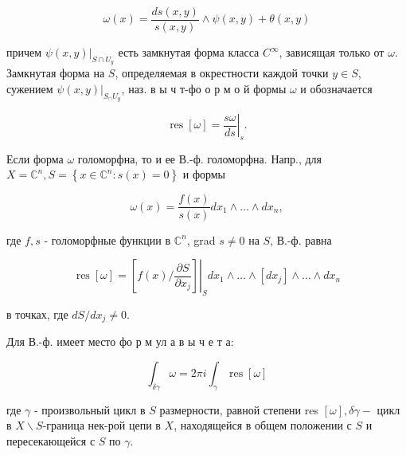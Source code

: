\documentclass[10pt]{article}
\begin{document}
\[

\omega(x)=\frac{d s(x, y)}{s(x, y)} \wedge \psi(x, y)+\theta(x, y)

\]



причем $\left.\psi(x, y)\right|_{S \cap U_{y}}$ есть замкнутая форма класса $C^{\infty}$, зависящая только от $\omega$. Замкнутая форма на $S$, определяемая в окрестности каждой точки $y \in S$, сужением $\left.\psi(x, y)\right|_{S_{\cap} U_{y}}$, наз. в ы ч т-фо о р м о й формы $\omega$ и обозначается



\[

\operatorname{res}[\omega]=\left.\frac{s \omega}{d s}\right|_{s} .

\]



Если форма $\omega$ голоморфна, то и ее В.-ф. голоморфна. Напр., для $X=\mathbb{C}^{n}, S=\left\{x \in \mathbb{C}^{n}: s(x)=0\right\}$ и формы



\[

\omega(x)=\frac{f(x)}{s(x)} d x_{1} \wedge \ldots \wedge d x_{n},

\]



где $f, s$ - голоморфные функции в $\mathbb{C}^{n}$, grad $s \neq 0$ на $S$, В.-ф. равна



\[

\operatorname{res}[\omega]=\left.\left[f(x) / \frac{\partial S}{\partial x_{j}}\right]\right|_{S} d x_{1} \wedge \ldots \wedge\left[d x_{j}\right] \wedge \ldots \wedge d x_{n}

\]



в точках, где $d S / d x_{j} \neq 0$.



Для В.-ф. имеет место фо р м ул а в ы ч е т а:



\[

\int_{\delta \gamma} \omega=2 \pi i \int_{\gamma} \operatorname{res}[\omega]

\]



где $\gamma$ - произвольный цикл в $S$ размерности, равной степени res $[\omega], \delta \gamma-$ цикл в $X \backslash S$-граница нек-рой цепи в $X$, находящейся в общем положении с $S$ и пересекающейся с $S$ по $\gamma$.
\end{document}
